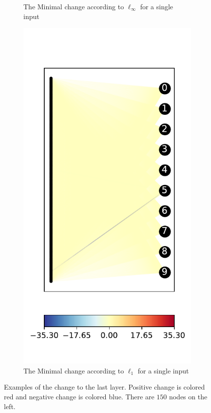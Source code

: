 \documentclass[a4paper]{easychair}
\begin{document}
\begin{figure}
\begin{subfigure}{0.4\linewidth}
     \caption{The Minimal change according to $\ell_\infty$ for a single input}
  \end{subfigure}
  \begin{subfigure}{0.4\linewidth}
    \includegraphics[width=\linewidth]{../data/results/problem2/last_layer_1_wm_example.pdf}
    \caption{The Minimal change according to $\ell_1$ for a single input}
  \end{subfigure}
  \caption{Examples of the change to the last layer. Positive change is colored red and negative change is colored blue. There are $150$ nodes on the left.}
  \label{fig:lastLayerExampleSingle}
\end{figure}
\end{document}
